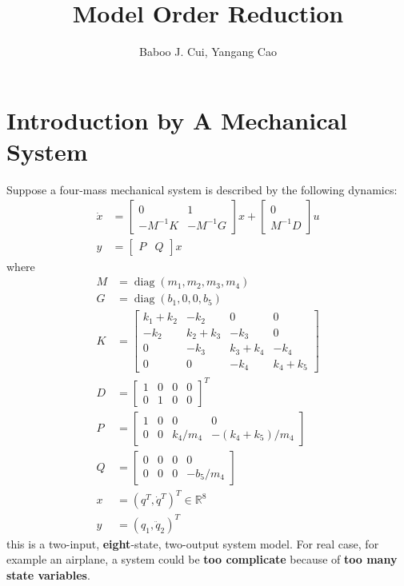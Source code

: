 \documentclass[10pt,a4paper,oneside]{article}
\author{Baboo J. Cui, Yangang Cao}
\title{Model Order Reduction}
\date{}
\begin{document}
\maketitle
\tableofcontents

\newpage

\section{Introduction by A Mechanical System}
Suppose a four-mass mechanical system is described by the following dynamics:
\begin{align*}
\dot{x} &= \left[\begin{array}{cc}{0} & {1} \\ {-M^{-1} K} & {-M^{-1} G}\end{array}\right] x+\left[\begin{array}{c}{0} \\ {M^{-1} D}\end{array}\right]u\\
y &= \left[\begin{array}{ll}{P} & {Q}\end{array}\right] x
\end{align*}
where
\begin{align*}
M &= \operatorname{diag}\left(m_{1}, m_{2}, m_{3}, m_{4}\right)\\
G &= \operatorname{diag}\left(b_{1}, 0,0, b_{5}\right)\\
K &= \left[\begin{array}{cccc}{k_{1}+k_{2}} & {-k_{2}} & {0} & {0} \\ {-k_{2}} & {k_{2}+k_{3}} & {-k_{3}} & {0} \\ {0} & {-k_{3}} & {k_{3}+k_{4}} & {-k_{4}} \\ {0} & {0} & {-k_{4}} & {k_{4}+k_{5}}\end{array}\right]\\
D &=\left[\begin{array}{llll}{1} & {0} & {0} & {0} \\ {0} & {1} & {0} & {0}\end{array}\right]^{T}\\
P &= \left[\begin{array}{cccc}{1} & {0} & {0} & {0} \\ {0} & {0} & {k_{4} / m_{4}} & {-\left(k_{4}+k_{5}\right) / m_{4}}\end{array}\right]\\
Q &= \left[\begin{array}{cccc}{0} & {0} & {0} & {0} \\ {0} & {0} & {0} & {-b_{5} / m_{4}}\end{array}\right]\\
x &=(q^T,\dot{q}^T)^T\in\mathbb{R}^8\\
y &=(q_1,\ddot{q}_2)^T
\end{align*}
this is a two-input, \textbf{eight}-state, two-output system model. For real case, for example an airplane, a system could be \textbf{too complicate} because of \textbf{too many state variables}.
\end{document}
